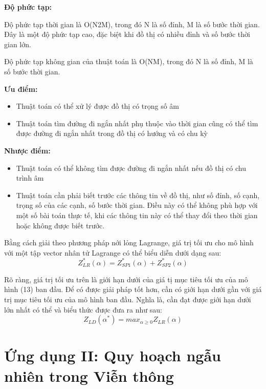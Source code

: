 \documentclass[a4paper]{article}
\begin{document}
    \textbf{Độ phức tạp:}

    Độ phức tạp thời gian là O(N2M), trong đó N là số đỉnh, M là số bước thời gian. 
    Đây là một độ phức tạp cao, đặc biệt khi đồ thị có nhiều đỉnh và số bước thời gian lớn. 

    Độ phức tạp không gian của thuật toán là O(NM), trong đó N là số đỉnh, M là số bước thời gian.

    \textbf{Ưu điểm:}
    \begin{itemize}
        \item Thuật toán có thể xử lý được đồ thị có trọng số âm 
        \item Thuật toán tìm đường đi ngắn nhất phụ thuộc vào thời gian cũng có thể tìm được đường đi ngắn nhất trong đồ thị có hướng và có chu kỳ
    \end{itemize}

    \textbf{Nhược điểm:}
    \begin{itemize}
        \item Thuật toán có thể không tìm được đường đi ngắn nhất nếu đồ thị có chu trình âm
        \item Thuật toán cần phải biết trước các thông tin về đồ thị, như số đỉnh, số cạnh, trọng số của các cạnh, số bước thời gian. 
            Điều này có thể không phù hợp với một số bài toán thực tế, khi các thông tin này có thể thay đổi theo thời gian hoặc không được biết trước.
    \end{itemize}

    Bằng cách giải theo phương pháp nới lỏng Lagrange, giá trị tối ưu cho mô hình với một tập vector nhân tử Lagrange
    có thể biểu diễn dưới dạng sau:
    \begin{displaymath}
        Z_{LR}^*(\alpha) = Z_{SP1}^*(\alpha) + Z_{SP2}^*(\alpha)
    \end{displaymath}

    Rõ ràng, giá trị tối ưu trên là giới hạn dưới của giá tị mục tiêu tối ưu của mô hình (13) ban đầu.
    Để có được giải pháp tốt hơn, cần có giới hạn dưới gần với giá trị mục tiêu tối ưu của mô hình ban đầu.
    Nghĩa là, cần đạt được giới hạn dưới lớn nhất có thể và biểu thức được đưa ra như sau:
    \begin{displaymath}
        Z_{LD}(\alpha^*) = max_{\alpha \geq 0} Z_{LR}(\alpha)
    \end{displaymath}

\section{Ứng dụng II: Quy hoạch ngẫu nhiên trong Viễn thông}
\end{document}

